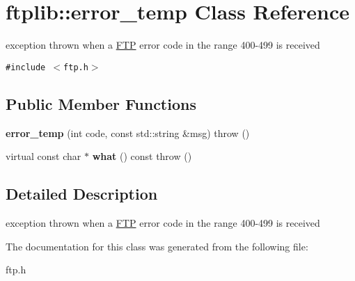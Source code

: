 \hypertarget{classftplib_1_1error__temp}{
\section{ftplib::error\_\-temp Class Reference}
\label{classftplib_1_1error__temp}
}
exception thrown when a \hyperlink{classftplib_1_1FTP}{FTP} error code in the range 400-499 is received  


{\tt \#include $<$ftp.h$>$}

\subsection*{Public Member Functions}
\begin{CompactItemize}
\item 
\hypertarget{classftplib_1_1error__temp_6c8a81fc949ee5591a85d5efeb492ea2}{
\textbf{error\_\-temp} (int code, const std::string \&msg)  throw ()}
\label{classftplib_1_1error__temp_6c8a81fc949ee5591a85d5efeb492ea2}

\item 
\hypertarget{classftplib_1_1error__temp_b34a46f6d2b57061eaa5c00d9cf946b0}{
virtual const char $\ast$ \textbf{what} () const   throw ()}
\label{classftplib_1_1error__temp_b34a46f6d2b57061eaa5c00d9cf946b0}

\end{CompactItemize}


\subsection{Detailed Description}
exception thrown when a \hyperlink{classftplib_1_1FTP}{FTP} error code in the range 400-499 is received 

The documentation for this class was generated from the following file:\begin{CompactItemize}
\item 
ftp.h\end{CompactItemize}
